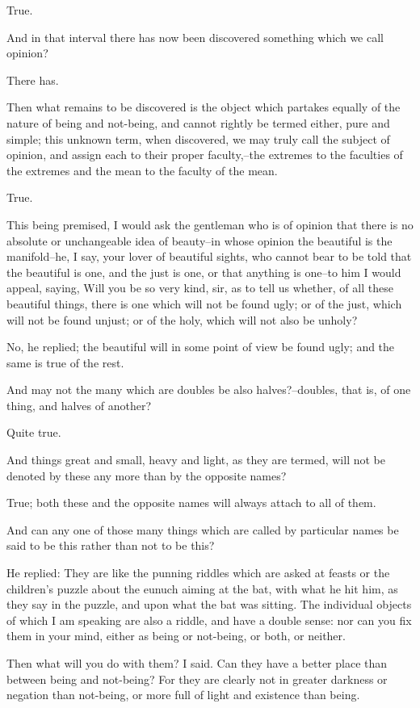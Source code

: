 True.

And in that interval there has now been discovered something which we
call opinion?

There has.

Then what remains to be discovered is the object which partakes equally
of the nature of being and not-being, and cannot rightly be termed
either, pure and simple; this unknown term, when discovered, we may
truly call the subject of opinion, and assign each to their proper
faculty,--the extremes to the faculties of the extremes and the mean to
the faculty of the mean.

True.

This being premised, I would ask the gentleman who is of opinion that
there is no absolute or unchangeable idea of beauty--in whose opinion
the beautiful is the manifold--he, I say, your lover of beautiful
sights, who cannot bear to be told that the beautiful is one, and the
just is one, or that anything is one--to him I would appeal, saying,
Will you be so very kind, sir, as to tell us whether, of all these
beautiful things, there is one which will not be found ugly; or of the
just, which will not be found unjust; or of the holy, which will not
also be unholy?

No, he replied; the beautiful will in some point of view be found ugly;
and the same is true of the rest.

And may not the many which are doubles be also halves?--doubles, that
is, of one thing, and halves of another?

Quite true.

And things great and small, heavy and light, as they are termed, will
not be denoted by these any more than by the opposite names?

True; both these and the opposite names will always attach to all of
them.

And can any one of those many things which are called by particular
names be said to be this rather than not to be this?

He replied: They are like the punning riddles which are asked at feasts
or the children's puzzle about the eunuch aiming at the bat, with
what he hit him, as they say in the puzzle, and upon what the bat
was sitting. The individual objects of which I am speaking are also
a riddle, and have a double sense: nor can you fix them in your mind,
either as being or not-being, or both, or neither.

Then what will you do with them? I said. Can they have a better place
than between being and not-being? For they are clearly not in greater
darkness or negation than not-being, or more full of light and existence
than being.

